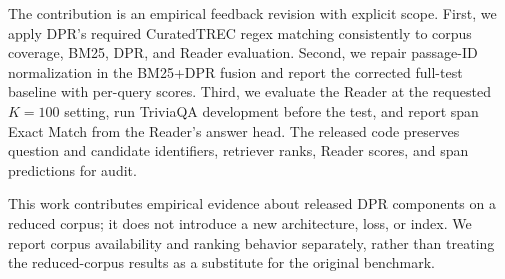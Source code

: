 The contribution is an empirical feedback revision with explicit scope. First, we apply DPR's required CuratedTREC regex matching consistently to corpus coverage, BM25, DPR, and Reader evaluation. Second, we repair passage-ID normalization in the BM25+DPR fusion and report the corrected full-test baseline with per-query scores. Third, we evaluate the Reader at the requested $K=100$ setting, run TriviaQA development before the test, and report span Exact Match from the Reader's answer head. The released code preserves question and candidate identifiers, retriever ranks, Reader scores, and span predictions for audit.

This work contributes empirical evidence about released DPR components on a reduced corpus; it does not introduce a new architecture, loss, or index. We report corpus availability and ranking behavior separately, rather than treating the reduced-corpus results as a substitute for the original benchmark.
